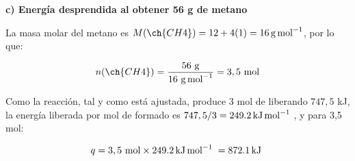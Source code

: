 \begin{exerciseEVAU}
\begin{solu}
        \textbf{c) Energía desprendida al obtener 56 g de metano}

        La masa molar del metano es \(M(\ch{CH4}) = 12 + 4(1) = \SI{16}{\gram\per\mole}\), por lo que:

        \begin{equation*}
            n(\ch{CH4}) = \dfrac{56 \ \si{\gram}}{16 \ \si{\gram\per\mole}} = 3,5 \ \text{mol}
        \end{equation*}

        Como la reacción, tal y como está ajustada, produce 3 mol de  liberando \(747,5\) kJ, la energía liberada por mol de  formado es \(747,5/3 = \energia[kjmol]{249.2}\), y para 3,5 mol:

        \begin{equation*}
            q = 3,5 \ \text{mol} \times \energia[kjmol]{249.2} = \energia[kj]{872.1}
        \end{equation*}

    \end{solu}
\end{exerciseEVAU}

